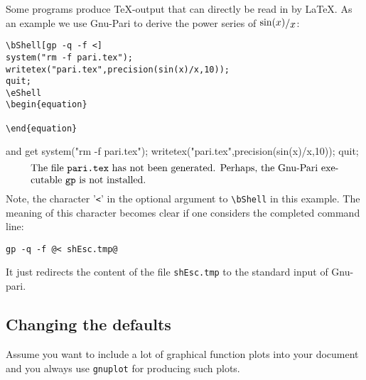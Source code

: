 Some programs produce \TeX-output that can directly be read in by
\LaTeX. As an example we use Gnu-Pari to derive the power series of $\raisebox{1pt}{$\sin(x)$}/\raisebox{-1pt}{$x$}$:
\begin{verbatim}
\bShell[gp -q -f <]
system("rm -f pari.tex");
writetex("pari.tex",precision(sin(x)/x,10));
quit;
\eShell
\begin{equation}

\end{equation}
\end{verbatim}
and get
\bShell[gp -q -f <]
system("rm -f pari.tex");
writetex("pari.tex",precision(sin(x)/x,10));
quit;
\eShell
\begin{equation}
  \IfFileExists{pari.tex}{}{
    \parbox{0.9\linewidth}{
      The file \texttt{pari.tex} has not been generated.
      Perhaps, the Gnu-Pari executable \texttt{gp}
      is not installed.}
  }
\end{equation}
Note, the character '\texttt{<}' in the optional argument to \verb=\bShell= in
this example. The meaning of this character becomes clear if one
considers the completed command line:
{
\makeatactive{}
\begin{verbatim}
gp -q -f @< shEsc.tmp@
\end{verbatim}
}
It just redirects the content of the file \texttt{shEsc.tmp} to the
standard input of Gnu-pari.

\subsection{Changing the defaults}
Assume you want to include a lot of graphical function plots into your
document and you always use \texttt{gnuplot} for producing such plots.

